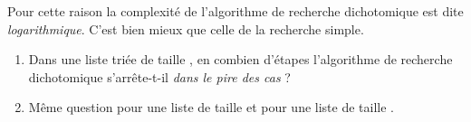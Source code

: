 Pour cette raison la complexité de l'algorithme de recherche dichotomique est dite \textit{logarithmique}. C'est bien mieux que celle de la recherche simple.

\begin{exercice}
	\begin{enumerate}
		\item Dans une liste triée de taille , en combien d'étapes l'algorithme de recherche dichotomique s'arrête-t-il \textit{dans le pire des cas} ? 
		\item Même question pour une liste de taille  et pour une liste de taille .
	\end{enumerate}
	
\end{exercice}
